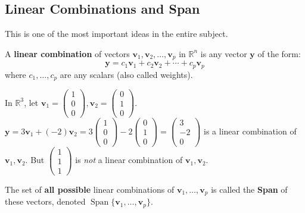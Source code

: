 \documentclass[oneside]{book}
\begin{document}
\subsection{Linear Combinations and Span}

This is one of the most important ideas in the entire subject.

\begin{definition}
A \textbf{linear combination} of vectors $\mathbf{v}_1, \mathbf{v}_2, \ldots, \mathbf{v}_p$ in $\mathbb{R}^n$ is any vector $\mathbf{y}$ of the form:
\[ \mathbf{y} = c_1\mathbf{v}_1 + c_2\mathbf{v}_2 + \cdots + c_p\mathbf{v}_p \]
where $c_1, \ldots, c_p$ are any scalars (also called weights).
\end{definition}

\begin{example}
In $\mathbb{R}^3$, let $\mathbf{v}_1 = \begin{pmatrix} 1 \\ 0 \\ 0 \end{pmatrix}, \mathbf{v}_2 = \begin{pmatrix} 0 \\ 1 \\ 0 \end{pmatrix}$.
$\mathbf{y} = 3\mathbf{v}_1 + (-2)\mathbf{v}_2 = 3\begin{pmatrix} 1 \\ 0 \\ 0 \end{pmatrix} - 2\begin{pmatrix} 0 \\ 1 \\ 0 \end{pmatrix} = \begin{pmatrix} 3 \\ -2 \\ 0 \end{pmatrix}$ is a linear combination of $\mathbf{v}_1, \mathbf{v}_2$.
But $\begin{pmatrix} 1 \\ 1 \\ 1 \end{pmatrix}$ is \emph{not} a linear combination of $\mathbf{v}_1, \mathbf{v}_2$.
\end{example}

\begin{definition}
The set of \textbf{all possible} linear combinations of $\mathbf{v}_1, \ldots, \mathbf{v}_p$ is called the \textbf{Span} of these vectors, denoted $\operatorname{Span}\{\mathbf{v}_1, \ldots, \mathbf{v}_p\}$.
\end{definition}
\end{document}
